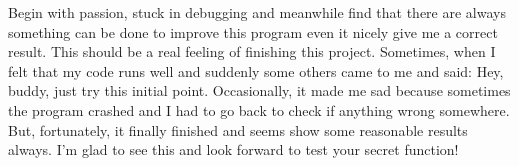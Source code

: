 \documentclass[11pt]{report}
\begin{document}
Begin with passion, stuck in debugging and meanwhile find that there are always something can be done to improve this program even it nicely give me a correct result. This should be a real feeling of finishing this project. Sometimes, when I felt that my code runs well and suddenly some others came to me and said: Hey, buddy, just try this initial point. Occasionally, it made me sad because sometimes the program crashed and I had to go back to check if anything wrong somewhere. But, fortunately, it finally finished and seems show some reasonable results always. I'm glad to see this and look forward to test your secret function! 




\end{document}
